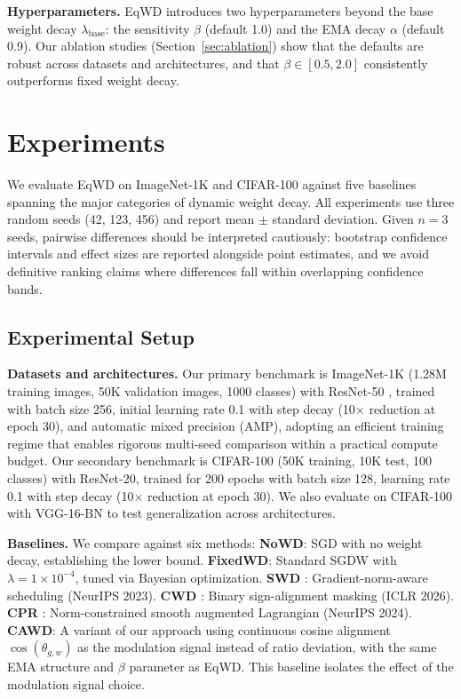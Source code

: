 \documentclass{article}
\begin{document}
\textbf{Hyperparameters.} EqWD introduces two hyperparameters beyond the
base weight decay $\lambda_{\text{base}}$: the sensitivity $\beta$
(default 1.0) and the EMA decay $\alpha$ (default 0.9). Our ablation
studies (Section~\ref{sec:ablation}) show that the defaults are robust across datasets
and architectures, and that $\beta \in [0.5, 2.0]$ consistently
outperforms fixed weight decay.


\section{Experiments}
\label{sec:experiments}

We evaluate EqWD on ImageNet-1K \citep{deng2009imagenet} and CIFAR-100
\citep{krizhevsky2009cifar} against five baselines spanning the major
categories of dynamic weight decay. All experiments use three random
seeds (42, 123, 456) and report mean $\pm$ standard deviation. Given
$n=3$ seeds, pairwise differences should be interpreted cautiously:
bootstrap confidence intervals and effect sizes are reported alongside
point estimates, and we avoid definitive ranking claims where
differences fall within overlapping confidence bands.

\subsection{Experimental Setup}
\label{sec:setup}

\textbf{Datasets and architectures.} Our primary benchmark is
ImageNet-1K (1.28M training images, 50K validation images, 1000 classes)
with ResNet-50 \citep{he2016resnet}, trained with batch
size 256, initial learning rate 0.1 with step decay (10$\times$ reduction at epoch 30), and automatic
mixed precision (AMP), adopting an efficient training regime that
enables rigorous multi-seed comparison within a practical compute budget. Our
secondary benchmark is CIFAR-100 (50K training, 10K test, 100 classes)
with ResNet-20, trained for 200 epochs with batch size 128, learning
rate 0.1 with step decay (10$\times$ reduction at epoch 30). We also evaluate on CIFAR-100 with
VGG-16-BN \citep{simonyan2015vgg} to test generalization across
architectures.

\textbf{Baselines.} We compare against six methods:
\textbf{NoWD}: SGD with no weight decay, establishing the lower bound.
\textbf{FixedWD}: Standard SGDW with $\lambda = 1 \times 10^{-4}$, tuned via Bayesian optimization.
\textbf{SWD} \citep{xie2023swd}: Gradient-norm-aware scheduling (NeurIPS 2023).
\textbf{CWD} \citep{chen2026cwd}: Binary sign-alignment masking (ICLR 2026).
\textbf{CPR} \citep{franke2024cpr}: Norm-constrained smooth augmented Lagrangian (NeurIPS 2024).
\textbf{CAWD}: A variant of our approach using continuous cosine alignment $\cos(\theta_{g,w})$ as the modulation signal instead of ratio deviation, with the same EMA structure and $\beta$ parameter as EqWD. This baseline isolates the effect of the modulation signal choice.
\end{document}

